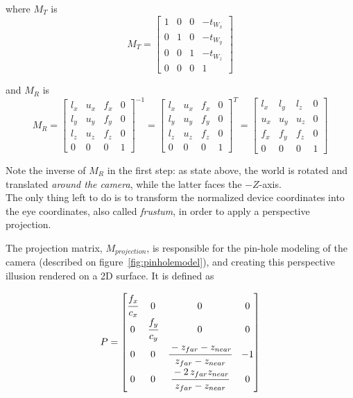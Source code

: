 where $M_T$ is
\begin{equation}
	M_T = \begin{bmatrix}
			1 & 0 & 0 & -t_W_x\\
			0 & 1 & 0 & -t_W_y\\
			0 & 0 & 1 & -t_W_z\\
			0 & 0 & 0 & 1
		\end{bmatrix}
\end{equation}

and $M_R$ is
\begin{equation}
	M_R = \begin{bmatrix}
			l_x & u_x & f_x & 0\\
			l_y & u_y & f_y & 0\\
			l_z & u_z & f_z & 0\\
			0 & 0 & 0 & 1
		\end{bmatrix}^{-1}
		= \begin{bmatrix}
			l_x & u_x & f_x & 0\\
			l_y & u_y & f_y & 0\\
			l_z & u_z & f_z & 0\\
			0 & 0 & 0 & 1
		\end{bmatrix}^{T}
		= \begin{bmatrix}
			l_x & l_y & l_z & 0\\
			u_x & u_y & u_z & 0\\
			f_x & f_y & f_z & 0\\
			0 & 0 & 0 & 1
		\end{bmatrix}
\end{equation}

Note the inverse of $M_R$ in the first step: as state above, the world is
rotated and translated \emph{around the camera}, while the latter faces the
$-Z$-axis.\\

The only thing left to do is to transform the normalized device coordinates
into the eye coordinates, also called \emph{frustum}, in order to apply a
perspective projection.

The projection matrix, $M_{projection}$, is responsible for the pin-hole
modeling of the camera (described on figure~\ref{fig:pinholemodel}), and
creating this perspective illusion rendered on a 2D surface. It is defined as

\begin{equation} \label{equ:projection}
	P = \begin{bmatrix}
			\cfrac{f_x}{c_x} & 0 & 0 & 0 \\
			0 & \cfrac{f_y}{c_y} & 0 & 0 \\
			0 & 0 & \cfrac{-z_{far} -z_{near}}{z_{far} - z_{near}} & -1\\
			0 & 0 & \cfrac{-2 \, z_{far} z_{near}}{z_{far}-z_{near}} & 0
		\end{bmatrix}
\end{equation}

